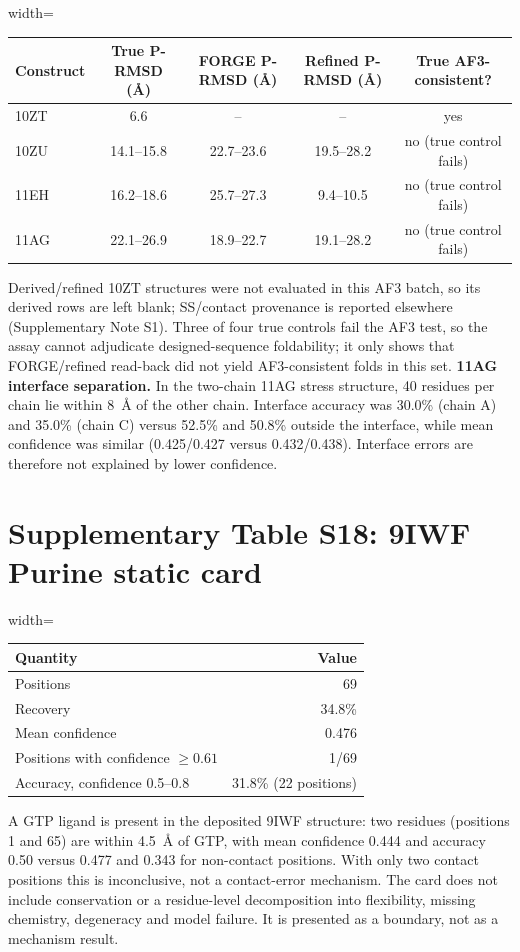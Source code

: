 \documentclass[pdflatex,sn-nature]{sn-jnl}
\begin{document}
\begingroup\scriptsize
\begin{adjustbox}{width=\textwidth}
\begin{tabular}{lcccc}
\toprule
Construct & True P-RMSD (\AA) & FORGE P-RMSD (\AA) & Refined P-RMSD (\AA) & True AF3-consistent? \\
\midrule
10ZT & 6.6 & -- & -- & yes \\
10ZU & 14.1--15.8 & 22.7--23.6 & 19.5--28.2 & no (true control fails) \\
11EH & 16.2--18.6 & 25.7--27.3 & 9.4--10.5 & no (true control fails) \\
11AG & 22.1--26.9 & 18.9--22.7 & 19.1--28.2 & no (true control fails) \\
\bottomrule
\end{tabular}
\end{adjustbox}
\endgroup

Derived/refined 10ZT structures were not evaluated in this AF3 batch, so its derived rows
are left blank; SS/contact provenance is reported elsewhere (Supplementary Note S1). Three
of four true controls fail the AF3 test, so the assay cannot adjudicate designed-sequence
foldability; it only shows that FORGE/refined read-back did not yield
AF3-consistent folds in this set. \textbf{11AG interface separation.} In the two-chain 11AG stress structure, 40 residues
per chain lie within 8~\AA{} of the other chain. Interface accuracy was 30.0\% (chain A)
and 35.0\% (chain C) versus 52.5\% and 50.8\% outside the interface, while mean confidence
was similar (0.425/0.427 versus 0.432/0.438). Interface errors are therefore not explained
by lower confidence.

\section*{Supplementary Table S18: 9IWF Purine static card}

\begingroup\scriptsize
\begin{adjustbox}{width=\textwidth}
\begin{tabular}{lr}
\toprule
Quantity & Value \\
\midrule
Positions & 69 \\
Recovery & 34.8\% \\
Mean confidence & 0.476 \\
Positions with confidence $\ge 0.61$ & 1/69 \\
Accuracy, confidence 0.5--0.8 & 31.8\% (22 positions) \\
\bottomrule
\end{tabular}
\end{adjustbox}
\endgroup

A GTP ligand is present in the deposited 9IWF structure: two residues (positions 1 and
65) are within 4.5~\AA{} of GTP, with mean confidence 0.444 and accuracy 0.50 versus 0.477
and 0.343 for non-contact positions. With only two contact positions this is inconclusive,
not a contact-error mechanism. The card does not include conservation or a residue-level
decomposition into flexibility, missing chemistry, degeneracy and model failure. It is
presented as a boundary, not as a mechanism result.
\end{document}
